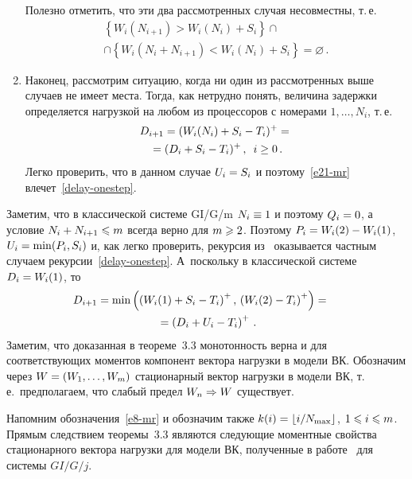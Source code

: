 \begin{multicols}{2}
\begin{enumerate}[1.]
Полезно отметить, что эти два рассмотренных случая несовместны, т.\,е.\
\begin{multline*}
\left\{W_i(N_{i+1})>W_i(N_i)+S_i\right\}\cap\\
\cap
\left\{W_i(N_i+N_{i+1})<W_i(N_i)+S_i\right\}=\varnothing\,.
\end{multline*}
\item
Наконец, рассмотрим ситуацию, когда ни один из рассмотренных выше случаев
не имеет места. Тогда, как нетрудно понять, величина задержки
определяется нагрузкой на любом из процессоров с номерами
$1,\ldots,N_{i}$, т.\,е.\
\begin{multline}
D_{i+1}=(W_{i}(N_{i})+S_{i}-T_{i})^{+}={}\\
{}=(D_{i}+S_{i}-T_{i})^{+}\,,\enskip i\ge0\,.
\label{e21-mr}
\end{multline}
Легко проверить, что в данном случае  $U_{i}\hm=S_{i}$  и поэтому~\eqref{e21-mr} 
влечет~\eqref{delay-onestep}.
\end{enumerate}

\smallskip

Заметим, что в  классической системе GI/G/m $N_{i}\hm\equiv 1$ и
поэтому $Q_i\hm=0$, а условие $N_{i}+N_{i+1}\hm\leqslant m$ всегда верно
для $m\hm\geqslant 2$. Поэтому $P_{i}\hm=W_{i}(2)\hm-W_{i}(1)$,  $U_{i}\hm=\min
(P_{i},S_{i})$ и, как легко проверить,  рекурсия из~\cite{scheller-sigman97}  
оказывается частным случаем рекурсии~\eqref{delay-onestep}.  
А~поскольку в классической сис\-те\-ме $D_i\hm=W_{i}(1)$, то
\begin{multline*}
\hspace*{-9.687pt}D_{i+1}=\min\left(\left(W_{i}(1)+S_{i}-T_{i}\right)^{+},\,\left(W_{i}(2)-T_{i}\right)^{+}\right)={}\\
{}=
\left(D_{i}+U_{i}-T_{i}\right)^{+}\,.
\end{multline*}
Заметим, что  доказанная в теореме~3.3 монотонность
верна и для соответствующих моментов компонент вектора нагрузки в
модели ВК. Обозначим через $W\hm=(W_1,\ldots,W_m)$ стационарный вектор
нагрузки в модели ВК, т.\,е.\ предполагаем, что слабый предел
$W_n\hm\Rightarrow W$ существует.

 Напомним
обозначения~\eqref{e8-mr} и обозначим также $k(i)\hm=\lfloor
i/N_{\max}\rfloor$, $1\hm\leqslant i\hm\leqslant m$.
 Прямым следствием теоремы~3.3 являются следующие
моментные свойства стационарного вектора нагрузки для модели ВК,
полученные в работе~\cite{scheller11} для системы $GI/G/j$.

\medskip


\end{multicols}
